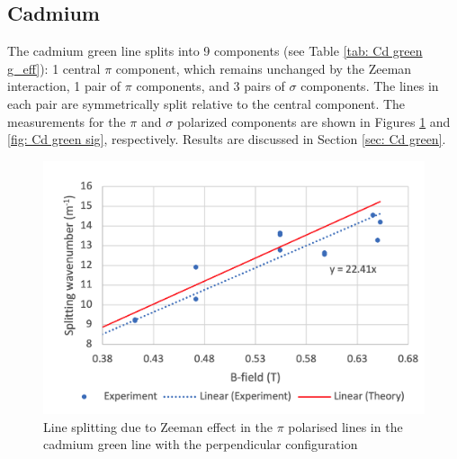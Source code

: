 \documentclass[11pt]{article}
\begin{document}
\subsection{Cadmium}
The cadmium green line splits into 9 components (see Table \ref{tab: Cd green g_eff}): 1 central $\pi$ component, which remains unchanged by the Zeeman interaction, 1 pair of $\pi$ components, and 3 pairs of $\sigma$ components. The lines in each pair are symmetrically split relative to the central component. The measurements for the $\pi$ and $\sigma$ polarized components are shown in Figures \ref{fig: Cd green pi} and \ref{fig: Cd green sig}, respectively. Results are discussed in Section \ref{sec: Cd green}.
\begin{figure}[h!]
    \centering
    \includegraphics[width=0.7\linewidth]{Cd green pi perp small.png}
    \captionsetup{justification=centering}
    \captionsetup{width=\linewidth}
    \caption{Line splitting due to Zeeman effect in the $\pi$ polarised lines in the cadmium green line with the perpendicular configuration}
    \label{fig: Cd green pi}
\end{figure}
\end{document}
